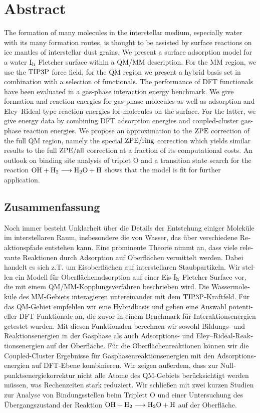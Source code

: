 \section*{Abstract}
      The formation of many molecules in the interstellar medium, especially
      water with its many formation routes, is thought to be assisted by
      surface reactions on ice mantles of interstellar dust grains. We present
      a surface adsorption model for a water $\text I_\text h$ Fletcher surface within a QM/MM description.
      For the MM region, we use the $\text{TIP3P}$ force field, for the QM region we
      present a hybrid basis set in combination with a selection of
      functionals. The performance of DFT functionals have been evaluated in a
      gas-phase interaction energy benchmark.
      We give formation and reaction energies for gas-phase molecules
      as well as adsorption and Eley--Rideal type reaction energies for
      molecules on the surface.
      For the latter, we give energy data by combining DFT adsorption energies
      and coupled-cluster gas-phase reaction energies. We propose an
      approximation to the $\text{ZPE}$ correction of the full QM region, namely the
      special $\text{ZPE}/\text{ring}$ correction which yields similar results to the full
      $\text{ZPE}/\text{all}$ correction at a fraction of its computational costs. An outlook
      on binding site analysis of triplet O and a transition state search for
      the reaction \mbox{$\text O \text H + \text H_2 \longrightarrow \text H _2 \text O + \text H$} shows that the
      model is fit for further application.
\begin{otherlanguage}{ngerman}
\section*{Zusammenfassung}
Noch immer besteht Unklarheit über die Details der Entstehung einiger Moleküle
im interstellaren Raum, insbesondere die von Wasser, das über verschiedene
Reaktionspfade entstehen kann. Eine prominente Theorie nimmt an, dass viele
relevante Reaktionen durch Adsorption auf Oberflächen vermittelt werden. Dabei
handelt es sich z.T. um Eisoberflächen auf interstellaren Staubpartikeln. Wir
stellen ein Modell für Oberflächenadsorption auf einer Eis $\text I_\text h$ Fletcher
Surface vor, die mit einem QM/MM-Kopplungsverfahren beschrieben wird. Die
Wassermoleküle des MM-Gebiets interagieren untereinander mit dem
$\text{TIP3P}$-Kraftfeld. Für das QM-Gebiet empfehlen wir eine Hybridbasis und geben
eine Auswahl potentieller DFT Funktionale an, die zuvor in einem Benchmark für
Interaktionsenergien getestet wurden. Mit diesen Funktionalen berechnen wir
sowohl Bildungs- und Reaktionsenergien in der Gasphase als auch Adsorptions- und
Eley--Rideal-\allowbreak Reaktionsenergien auf der Oberfläche. Für die
Oberflächenreaktionen können wir die Coupled-Cluster Ergebnisse für Gasphasenreaktionsenergien mit den
Adsorptionsenergien auf DFT-Ebene kombinieren. Wir zeigen außerdem, dass zur
Nullpunktsenergiekorrektur nicht alle Atome des QM-Gebiets berücksichtigt werden
müssen, was Rechenzeiten stark reduziert. Wir schließen mit zwei kurzen Studien
zur Analyse von Bindungsstellen beim Triplett O und einer Untersuchung des
Übergangszustand der Reaktion \mbox{$\text O \text H + \text H_2 \longrightarrow \text H _2 \text O + \text H$} auf der
Oberfläche.
\end{otherlanguage}
